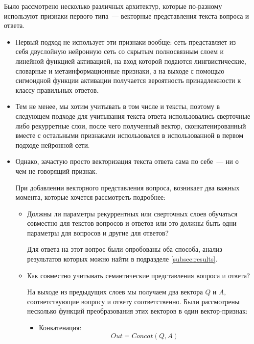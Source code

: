 \documentclass[../diploma.tex]{subfiles}
\begin{document}
	Было рассмотрено несколько различных архитектур, которые по-разному используют признаки первого типа~--- векторные представления текста вопроса и ответа.

	\begin{itemize}
		\item
		Первый подход не использует эти признаки вообще: сеть представляет из себя двуслойную нейронную сеть со скрытым полносвязным слоем и линейной функцией активацией, 
		на вход которой подаются лингвистические, словарные и метаинформационные признаки, 
		а на выходе с помощью сигмоидной функции активации получается вероятность принадлежности к классу правильных ответов.
		
		\item
		Тем не менее, мы хотим учитывать в том числе и тексты, поэтому в следующем подходе для учитывания текста ответа использовались сверточные либо рекурретные слои, 
		после чего полученный вектор, сконкатенированный вместе с остальными признаками использовался в использованной в первом подходе нейронной сети.

		\item
		Однако, зачастую просто векторизация текста ответа сама по себе~--- ни о чем не говорящий признак.
		
		При добавлении векторного представления вопроса, возникает два важных момента, которые хочется рассмотреть подробнее: 
		\begin{itemize}
			\item
			Должны ли параметры рекуррентных или сверточных слоев обучаться совместно для текстов вопросов и ответов 
			или это должны быть одни параметры для вопросов и другие для ответов?
			                                                                                                                   
			Для ответа на этот вопрос были опробованы оба способа, анализ результатов которых можно найти в подразделе \ref{subsec:results}.

			\item
			Как совместно учитывать семантические представления вопроса и ответа?

			На выходе из предыдущих слоев мы получаем два вектора $Q$ и $A$, соответствующие вопросу и ответу соответственно.
			Были рассмотрены несколько функций преобразования этих векторов в один вектор-признак:

			\begin{itemize}
				\item
				Конкатенация: 
				\begin{equation}
					Out = Concat(Q, A)
   				\end{equation}


\end{itemize}
\end{itemize}
\end{itemize}
\end{document}
